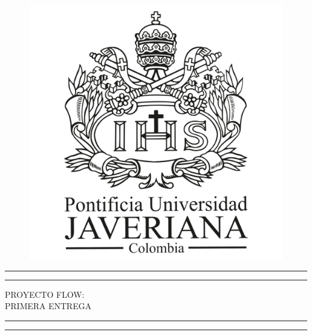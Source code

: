 \documentclass[letter,12pt]{article}
\begin{document}
\begin{titlepage} %
	
	\centering %
	
	\scshape %
	
	\vspace*{\baselineskip} %
	
	\begin{figure}[ht!]
    	\centering
    	\includegraphics[width=0.4\linewidth]{img/PUJ.png}
    \end{figure}
    
    \vspace*{1.5\baselineskip} 
	
	
	\rule{\textwidth}{1.6pt}\vspace*{-\baselineskip}\vspace*{2pt} %
	\rule{\textwidth}{0.4pt} %
	
	\vspace{0.75\baselineskip} %
	
	{\LARGE PROYECTO FLOW: \\ PRIMERA ENTREGA \\} %
	
	\vspace{0.75\baselineskip} %
	
	\rule{\textwidth}{0.4pt}\vspace*{-\baselineskip}\vspace{3.2pt} %
	\rule{\textwidth}{1.6pt} %
	
	\vspace{2\baselineskip} %
	

\end{titlepage}
\end{document}
